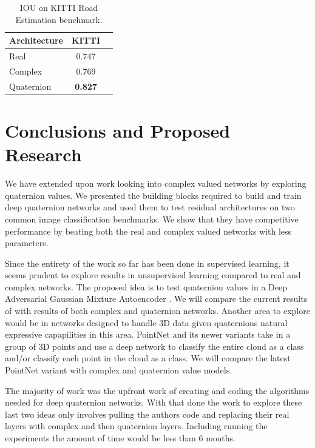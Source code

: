 \begin{table}[h]
	\centering
		\begin{tabular}{l c c}
			\hline
			Architecture & KITTI \\
			\hline
			Real & 0.747 \\
			Complex & 0.769 \\
			Quaternion & \textbf{0.827}
		\end{tabular}
	\caption{IOU on KITTI Road Estimation benchmark.}
	\label{t:results2}
\end{table}


\section{Conclusions and Proposed Research}
We have extended upon work looking into complex valued networks by exploring quaternion values.
We presented the building blocks required to build and train deep quaternion networks and used them to test residual architectures on two common image classification benchmarks.
We show that they have competitive performance by beating both the real and complex valued networks with less parameters.

Since the entirety of the work so far has been done in supervised learning, it seems prudent to explore results in unsupervised learning compared to real and complex networks.
The proposed idea is to test quaternion values in a Deep Adversarial Gaussian Mixture Autoencoder \cite{harchaoui2017deep}.
We will compare the current results of with results of both complex and quaternion networks.
Another area to explore would be in networks designed to handle 3D data given quaternions natural expressive capapilities in this area.
PointNet \cite{qi2017pointnet} and its newer variants take in a group of 3D points and use a deep network to classify the entire cloud as a class and/or classify each point in the cloud as a class.
We will compare the latest PointNet variant with complex and quaternion value models.

The majority of work was the upfront work of creating and coding the algorithms needed for deep quaternion networks.
With that done the work to explore these last two ideas only involves pulling the authors code and replacing their real layers with complex and then quaternion layers.
Including running the experiments the amount of time would be less than 6 months.